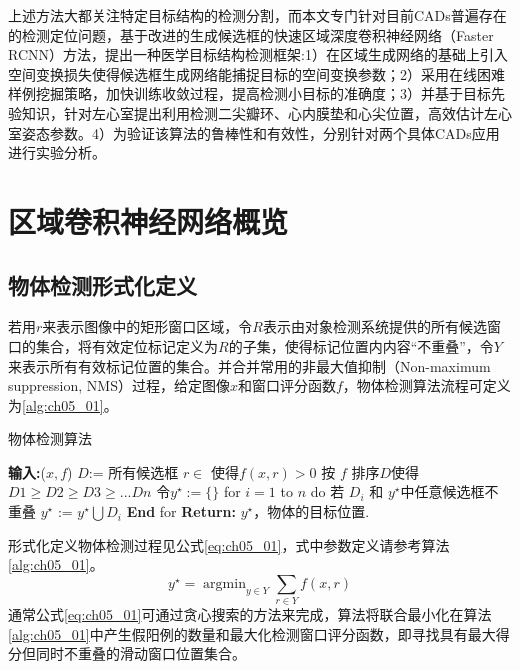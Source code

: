 上述方法大都关注特定目标结构的检测分割，而本文专门针对目前CADs普遍存在的检测定位问题，基于改进的生成候选框的快速区域深度卷积神经网络（Faster RCNN）\citep{Ren2015a}方法，提出一种医学目标结构检测框架:1）在区域生成网络的基础上引入空间变换损失使得候选框生成网络能捕捉目标的空间变换参数；2）采用在线困难样例挖掘策略，加快训练收敛过程，提高检测小目标的准确度；3）并基于目标先验知识，针对左心室提出利用检测二尖瓣环、心内膜垫和心尖位置，高效估计左心室姿态参数。4）为验证该算法的鲁棒性和有效性，分别针对两个具体CADs应用进行实验分析。

\section{区域卷积神经网络概览}
 
\subsection{物体检测形式化定义}
若用$r$来表示图像中的矩形窗口区域，令$R$表示由对象检测系统提供的所有候选窗口的集合，将有效定位标记定义为$R$的子集，使得标记位置内内容“不重叠”，令$Y$来表示所有有效标记位置的集合。并合并常用的非最大值抑制（Non-maximum suppression, NMS）过程，给定图像$x$和窗口评分函数$f$，物体检测算法流程可定义为\ref{alg:ch05_01}。
\begin{algorithm}[!htbp]
      \small
      \caption{物体检测算法}\label{alg:ch05_01}
      \begin{algorithmic}[1]

          \State \textbf{输入:}{($x,f$)}
          \State $D$:= 所有候选框 $r \in$ 使得$f(x, r) > 0$            
          \State 按 $f$ 排序$D$使得 $D1\geq D2 \geq D3 \geq ...Dn$ 
          \State 令$y^\star:=\{ \}$
          \State \qquad for $i = 1$ to $n$ do
          \State  \qquad\qquad  若 $D_{i}$ 和 $y^\star$中任意候选框不重叠
          \State   \qquad \qquad      $y^\star$ := $y^\star  \bigcup {D_{i}}$
          \State \qquad\textbf{End} for 
          \State \textbf{Return:}  $y^\star$，物体的目标位置.
      \end{algorithmic}
  \end{algorithm} 
 
形式化定义物体检测过程见公式\ref{eq:ch05_01}，式中参数定义请参考算法\ref{alg:ch05_01}。
\begin{equation} 
\label{eq:ch05_01}
      y^{\star}=\mathop{\arg\min}_{y\in Y}\sum _{r\in Y} f(x,r)
\end{equation}                               	 
通常公式\ref{eq:ch05_01}可通过贪心搜索的方法来完成，算法将联合最小化在算法\ref{alg:ch05_01}中产生假阳例的数量和最大化检测窗口评分函数，即寻找具有最大得分但同时不重叠的滑动窗口位置集合。
